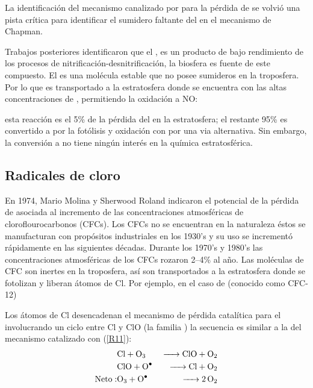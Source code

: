 La identificación del mecanismo canalizado por  para la pérdida de  se volvió una pista crítica para identificar el sumidero faltante del  en el mecanismo de Chapman.

Trabajos posteriores identificaron que el , es un producto de bajo rendimiento de los procesos de nitrificación-desnitrificación, la biosfera es fuente de este compuesto. El  es una molécula estable que no posee sumideros en la troposfera. Por lo que es transportado a la estratosfera donde se encuentra con las altas concentraciones de , permitiendo la oxidación a NO:

esta reacción es el 5\% de la pérdida del   en la estratosfera; el restante 95\% es convertido a  por la fotólisis y oxidación con    por una via alternativa. Sin embargo, la conversión a  no tiene ningún interés en la química estratosférica.

\subsection{Radicales de cloro}
En 1974, Mario Molina y Sherwood Roland indicaron el potencial de la pérdida de  asociada al incremento de las concentraciones atmosféricas de cloroflourocarbonos (CFCs). Los CFCs no se encuentran en la naturaleza éstos se manufacturan con propósitos industriales en los 1930's  y su uso se incrementó rápidamente en las siguientes décadas. Durante los 1970's y 1980's las concentraciones atmosféricas de los CFCs rozaron 2--4\% al año. Las moléculas de CFC son inertes en la troposfera,  así son transportados a la estratosfera donde se fotolizan y liberan átomos de Cl. Por ejemplo, en el caso de  (conocido como CFC-12) 

Los átomos de Cl  desencadenan el mecanismo de pérdida catalítica para el  involucrando un ciclo entre Cl y ClO (la familia ) la secuencia es similar a la del mecanismo catalizado con  (\ref{R11}):
\begin{eqnarray*}
            & \ce{Cl + O3     &->   ClO + O2}  \\
            &\ce{ClO +  O^.   & ->   Cl + O2 }  \\
  \mathrm{Neto: } &\ce{O3 + O^.   &->  2O2} 
\end{eqnarray*}


